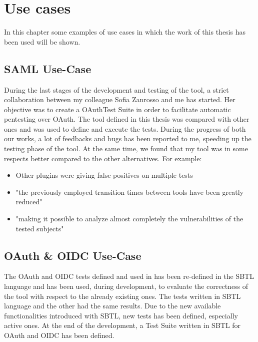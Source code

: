 \chapter{Use cases}
\label{chap:Use_cases}
In this chapter some examples of use cases in which the work of this thesis has been used will be shown.

\section{SAML Use-Case}
During the last stages of the development and testing of the tool, a strict collaboration between my colleague Sofia Zanrosso and me has started. Her objective was to create a \gls{OAuth}Test Suite in order to facilitate automatic pentesting over \gls{OAuth}\cite{sofia_zanrosso}. The tool defined in this thesis was compared with other ones and was used to define and execute the tests. During the progress of both our works, a lot of feedbacks and bugs has been reported to me, speeding up the testing phase of the tool. At the same time, we found that my tool was in some respects better compared to the other alternatives. For example:
\begin{itemize}
    \item Other plugins were giving false positives on multiple tests
    \item "the previously employed transition times between tools have been greatly reduced"
    \item "making it possible to analyze almost completely the vulnerabilities of the tested subjects"
\end{itemize}


\section{OAuth \& OIDC Use-Case}    
The \gls{OAuth} and \gls{OIDC} tests defined and used in \cite{claudio_grisenti,wendy_barreto} has been re-defined in the SBTL language and has been used, during development, to evaluate the correctness of the tool with respect to the already existing ones. The tests written in SBTL language and the other had the same results. Due to the new available functionalities introduced with SBTL, new tests has been defined, especially active ones.
At the end of the development, a Test Suite written in SBTL for OAuth and OIDC has been defined.





